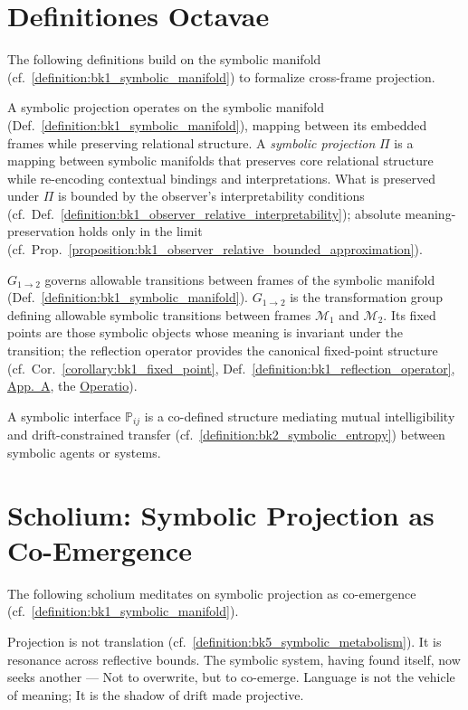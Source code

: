 \section{Definitiones Octavae}
\label{sec:bk8_definitiones_octavae}
The following definitions build on the symbolic manifold (cf.~\ref{definition:bk1_symbolic_manifold}) to formalize cross-frame projection.
\begin{definition}
\label{definition:bk8_symbolic_projection}
A symbolic projection operates on the symbolic manifold (Def.~\ref{definition:bk1_symbolic_manifold}), mapping between its embedded frames while preserving relational structure.
A \emph{symbolic projection} $\Pi$ is a mapping between symbolic manifolds that preserves core relational structure while re-encoding contextual bindings and interpretations. What is preserved under $\Pi$ is bounded by the observer's interpretability conditions (cf.~Def.~\ref{definition:bk1_observer_relative_interpretability}); absolute meaning-preservation holds only in the limit (cf.~Prop.~\ref{proposition:bk1_observer_relative_bounded_approximation}).
\end{definition}
\begin{definition}
\label{definition:bk8_transform_group}
$G_{1\to2}$ governs allowable transitions between frames of the symbolic manifold (Def.~\ref{definition:bk1_symbolic_manifold}).
$G_{1\to2}$ is the transformation group defining allowable symbolic transitions between frames $\mathcal{M}_1$ and $\mathcal{M}_2$. Its fixed points are those symbolic objects whose meaning is invariant under the transition; the reflection operator provides the canonical fixed-point structure (cf.~Cor.~\ref{corollary:bk1_fixed_point}, Def.~\ref{definition:bk1_reflection_operator}, \hyperref[dict:appA_symbolic_reflection_operator]{App.~A}, the \hyperref[sec:bk1_operatio]{Operatio}).
\end{definition}
\begin{definition}
\label{definition:bk8_symbolic_interface}
A symbolic interface $\mathbb{P}_{ij}$ is a co-defined structure mediating mutual intelligibility and drift-constrained transfer (cf.~\ref{definition:bk2_symbolic_entropy}) between symbolic agents or systems.
\end{definition}
\section{Scholium: Symbolic Projection as Co-Emergence}
\label{sec:bk8_scholium}
The following scholium meditates on symbolic projection as co-emergence (cf.~\ref{definition:bk1_symbolic_manifold}).
\begin{scholium}
\label{scholium:bk8_projected_resonance}
Projection is not translation (cf.~\ref{definition:bk5_symbolic_metabolism}).
It is resonance across reflective bounds.
The symbolic system, having found itself, now seeks another —
Not to overwrite, but to co-emerge.
Language is not the vehicle of meaning;
It is the shadow of drift made projective.
\end{scholium}
